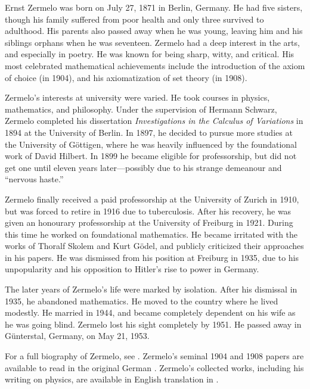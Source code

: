 \documentclass[../../../include/open-logic-section]{subfiles}
\begin{document}


Ernst Zermelo was born on July 27, 1871 in Berlin, Germany. He had
five sisters, though his family suffered from poor health and only
three survived to adulthood. His parents also passed away when he was
young, leaving him and his siblings orphans when he was seventeen.
Zermelo had a deep interest in the arts, and especially in poetry. He
was known for being sharp, witty, and critical. His most celebrated
mathematical achievements include the introduction of the axiom of
choice (in 1904), and his axiomatization of set theory (in 1908).

Zermelo's interests at university were varied. He took courses in
physics, mathematics, and philosophy. Under the supervision of Hermann
Schwarz, Zermelo completed his dissertation \emph{Investigations in
  the Calculus of Variations} in 1894 at the University of Berlin. In
1897, he decided to pursue more studies at the University of
G\"{o}ttigen, where he was heavily influenced by the foundational work
of David Hilbert. In 1899 he became eligible for professorship, but
did not get one until eleven years later---possibly due to his strange
demeanour and ``nervous haste.''

Zermelo finally received a paid professorship at the University of
Zurich in 1910, but was forced to retire in 1916 due to
tuberculosis. After his recovery, he was given an honourary
professorship at the University of Freiburg in 1921. During this time
he worked on foundational mathematics.  He became irritated with the
works of Thoralf Skolem and Kurt G\"{o}del, and publicly criticized
their approaches in his papers.  He was dismissed from his position at
Freiburg in 1935, due to his unpopularity and his opposition to
Hitler's rise to power in Germany.
 
The later years of Zermelo's life were marked by isolation. After his
dismissal in 1935, he abandoned mathematics. He moved to the country
where he lived modestly. He married in 1944, and became completely
dependent on his wife as he was going blind. Zermelo lost his sight
completely by 1951. He passed away in G\"{u}nterstal, Germany, on May
21, 1953.

\begin{reading}
For a full biography of Zermelo, see \cite{Ebbinghaus2015}.
Zermelo's seminal 1904 and 1908 papers are available to read in the
original German \cite{Zermelo1904,Zermelo1908}.  Zermelo's collected
works, including his writing on physics, are available in English
translation in \cite{Ebbinghaus2010,Ebbinghaus2013}.
\end{reading}
\end{document}
